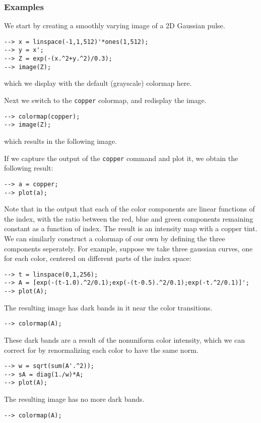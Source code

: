\subsubsection{Examples}
We start by creating a smoothly varying image of a 2D Gaussian pulse.
\begin{verbatim}
--> x = linspace(-1,1,512)'*ones(1,512);
--> y = x';
--> Z = exp(-(x.^2+y.^2)/0.3);
--> image(Z);
\end{verbatim}
which we display with the default (grayscale) colormap here.


Next we switch to the \verb|copper| colormap, and redisplay the image.
\begin{verbatim}
--> colormap(copper);
--> image(Z);
\end{verbatim}
which results in the following image.


If we capture the output of the \verb|copper| command and plot it, we obtain
the following result:
\begin{verbatim}
--> a = copper;
--> plot(a);
\end{verbatim}


Note that in the output that each of the color components are linear functions
of the index, with the ratio between the red, blue and green components remaining
constant as a function of index.  The result is an intensity map with a copper
tint.  We can similarly construct a colormap of our own by defining the 
three components seperately.  For example, suppose we take three gaussian
curves, one for each color, centered on different parts of the index space:
\begin{verbatim}
--> t = linspace(0,1,256);
--> A = [exp(-(t-1.0).^2/0.1);exp(-(t-0.5).^2/0.1);exp(-t.^2/0.1)]';
--> plot(A);
\end{verbatim}


The resulting image has dark bands in it near the color transitions.
\begin{verbatim}
--> colormap(A);
\end{verbatim}

These dark bands are a result of the nonuniform color intensity, which 
we can correct for by renormalizing each color to have the same norm.
\begin{verbatim}
--> w = sqrt(sum(A'.^2));
--> sA = diag(1./w)*A;
--> plot(A);
\end{verbatim}

The resulting image has no more dark bands.
\begin{verbatim}
--> colormap(A);
\end{verbatim}
